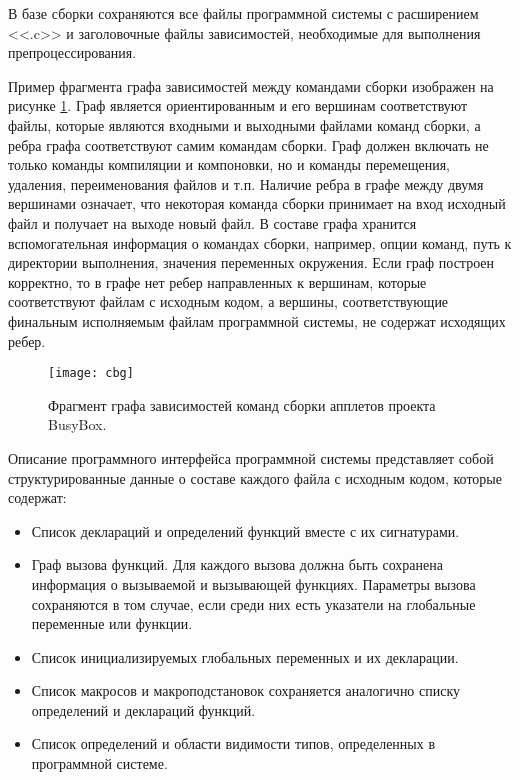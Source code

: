 В базе сборки сохраняются все файлы программной системы с расширением <<.c>> и заголовочные файлы зависимостей, необходимые для выполнения препроцессирования.

Пример фрагмента графа зависимостей между командами сборки изображен на рисунке \ref{figure:cbg}.
Граф является ориентированным и его вершинам соответствуют файлы, которые являются входными и выходными файлами команд сборки, а ребра графа соответствуют самим командам сборки.
Граф должен включать не только команды компиляции и компоновки, но и команды перемещения, удаления, переименования файлов и т.п.
Наличие ребра в графе между двумя вершинами означает, что некоторая команда сборки принимает на вход исходный файл и получает на выходе новый файл.
В составе графа хранится вспомогательная информация о командах сборки, например, опции команд, путь к директории выполнения, значения переменных окружения.
Если граф построен корректно, то в графе нет ребер направленных к вершинам, которые соответствуют файлам с исходным кодом, а вершины, соответствующие финальным исполняемым файлам программной системы, не содержат исходящих ребер.

\begin{figure}
\centering
\texttt{[image: cbg]}
\caption{Фрагмент графа зависимостей команд сборки апплетов проекта BusyBox.}
\label{figure:cbg}
\end{figure}

Описание программного интерфейса программной системы представляет собой структурированные данные о составе каждого файла с исходным кодом, которые содержат:
\begin{itemize}
    \item Список деклараций и определений функций вместе с их сигнатурами.
    \item Граф вызова функций. Для каждого вызова должна быть сохранена информация о вызываемой и вызывающей функциях.
    Параметры вызова сохраняются в том случае, если среди них есть указатели на глобальные переменные или функции.
    \item Список инициализируемых глобальных переменных и их декларации.
    \item Список макросов и макроподстановок сохраняется аналогично списку определений и деклараций функций.
    \item Список определений и области видимости типов, определенных в программной системе.
\end{itemize}

